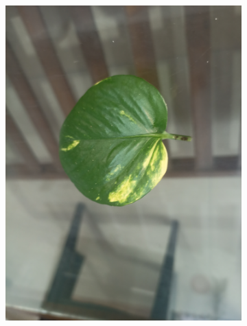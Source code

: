 \documentclass[twocolumn]{article}
\begin{document}
\begin{figure}[H]
\begin{subfigure}[b]{0.30\columnwidth}
        \includegraphics[width=\textwidth]{money3}
    \end{subfigure}
    \vspace{0.5em}
    

\end{figure}
\end{document}
